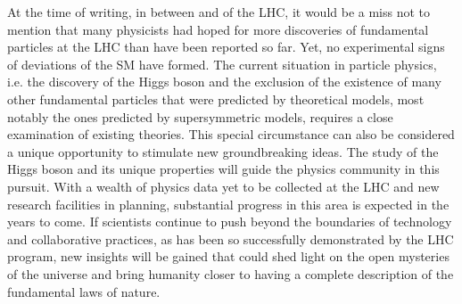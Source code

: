 At the time of writing, in between \RunTwo and \RunThr of the LHC, it would be a miss not to mention that many physicists had hoped for more discoveries of fundamental particles at the LHC than have been reported so far.
Yet, no experimental signs of deviations of the SM have formed.
The current situation in particle physics, i.e. the discovery of the Higgs boson and the exclusion of the existence of many other fundamental particles that were predicted by theoretical models, most notably the ones predicted by supersymmetric models, requires a close examination of existing theories. This special circumstance can also be considered a unique opportunity to stimulate new groundbreaking ideas.
The study of the Higgs boson and its unique properties will guide the physics community in this pursuit.
With a wealth of physics data yet to be collected at the LHC and new research facilities in planning, substantial progress in this area is expected in the years to come. 
If scientists continue to push beyond the boundaries of technology and collaborative practices, as has been so successfully demonstrated by the LHC program, new insights will be gained that could shed light on the open mysteries of the universe and bring humanity closer to having a complete description of the fundamental laws of nature. 


